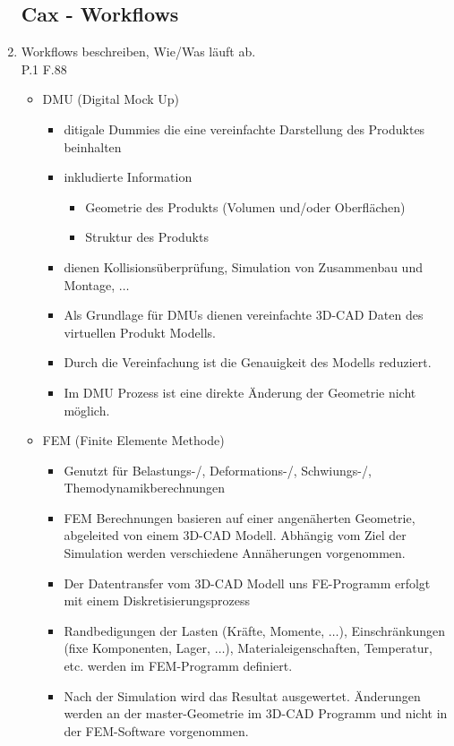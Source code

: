 \documentclass[10pt,a4paper,fleqn]{article}
\begin{document}
\begin{enumerate}
\subsection{Cax - Workflows}
	\item Workflows beschreiben, Wie/Was läuft ab.\\
		P.1 F.88
			\begin{itemize}
				\item DMU (Digital Mock Up)
					\begin{itemize}
						\item ditigale Dummies die eine vereinfachte Darstellung des Produktes beinhalten
						\item inkludierte Information
							\begin{itemize}
								\item Geometrie des Produkts (Volumen und/oder Oberflächen)
								\item Struktur des Produkts
							\end{itemize}
						\item dienen Kollisionsüberprüfung, Simulation von Zusammenbau und Montage, $\dots$
						\item Als Grundlage für DMUs dienen vereinfachte 3D-CAD Daten des virtuellen Produkt Modells.
						\item Durch die Vereinfachung ist die Genauigkeit des Modells reduziert.
						\item Im DMU Prozess ist eine direkte Änderung der Geometrie nicht möglich.
						
					\end{itemize}
				\item FEM (Finite Elemente Methode)
					\begin{itemize}
						\item Genutzt für Belastungs-/, Deformations-/, Schwiungs-/, Themodynamikberechnungen
						\item FEM Berechnungen basieren auf einer angenäherten Geometrie, abgeleited von einem 3D-CAD Modell. Abhängig vom Ziel der Simulation werden verschiedene Annäherungen vorgenommen.
						\item Der Datentransfer vom 3D-CAD Modell uns FE-Programm erfolgt mit einem Diskretisierungsprozess
						\item Randbedigungen der Lasten (Kräfte, Momente, $\dots$), Einschränkungen (fixe Komponenten, Lager, $\dots$), Materialeigenschaften, Temperatur, etc. werden im FEM-Programm definiert.
						\item Nach der Simulation wird das Resultat ausgewertet. Änderungen werden an der master-Geometrie im 3D-CAD Programm und nicht in der FEM-Software vorgenommen.
					\end{itemize}


\end{itemize}
\end{enumerate}
\end{document}
